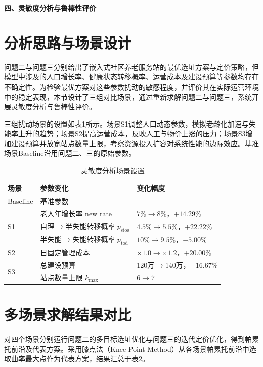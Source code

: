 \documentclass[12pt,a4paper]{article}
\begin{document}
\begin{center}
{\LARGE\bfseries 四、灵敏度分析与鲁棒性评价}
\end{center}
\vspace{0.5cm}

\section{分析思路与场景设计}

问题二与问题三分别给出了嵌入式社区养老服务站的最优选址方案与定价策略，但模型中涉及的人口增长率、健康状态转移概率、运营成本及建设预算等参数均存在不确定性。为检验最优方案对这些参数扰动的敏感程度，并评价其在实际运营环境中的稳定表现，本节设计了三组对比场景，通过重新求解问题二与问题三，系统开展灵敏度分析与鲁棒性评价。

三组扰动场景的设置如表1所示。场景S1调整人口动态参数，模拟老龄化加速与失能率上升的趋势；场景S2提高运营成本，反映人工与物价上涨的压力；场景S3增加建设预算并放宽站点数量上限，考察资源投入扩容对系统性能的边际效应。基准场景Baseline沿用问题二、三的原始参数。

\begin{table}[H]
\centering
\caption{灵敏度分析场景设置}
\begin{tabular}{lll}
\toprule
场景 & 参数变化 & 变化幅度 \\
\midrule
Baseline & 基准参数 & --- \\
\midrule
\multirow{3}{*}{S1} & 老人年增长率 $\mathrm{new\_rate}$ & $7\% \to 8\%$，$+14.29\%$ \\
 & 自理$\to$半失能转移概率 $p_{\mathrm{stos}}$ & $4.5\% \to 5.5\%$，$+22.22\%$ \\
 & 半失能$\to$失能转移概率 $p_{\mathrm{tod}}$ & $10\% \to 9.5\%$，$-5.00\%$ \\
\midrule
S2 & 日固定管理成本 & $\times 1.0 \to \times 1.2$，$+20.00\%$ \\
\midrule
\multirow{2}{*}{S3} & 总建设预算 & 120万$\to$140万，$+16.67\%$ \\
 & 站点数量上限 $k_{\max}$ & $6 \to 7$ \\
\bottomrule
\end{tabular}
\end{table}

\section{多场景求解结果对比}

对四个场景分别运行问题二的多目标选址优化与问题三的迭代定价优化，得到帕累托前沿及代表方案。采用膝点法（Knee Point Method）从各场景帕累托前沿中选取曲率最大点作为代表方案，结果汇总于表2。
\end{document}
